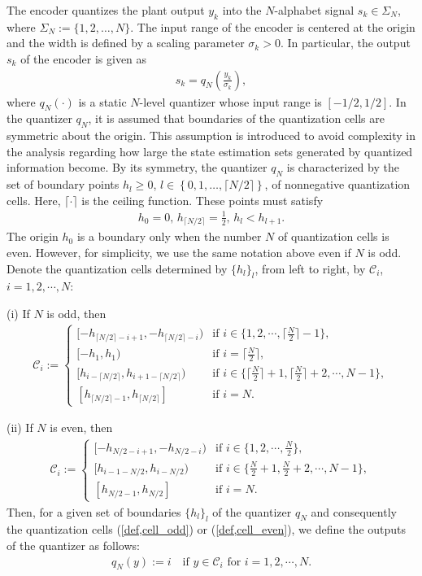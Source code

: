 \documentclass[a4paper, 11pt]{article}
\newcommand{\calC}{\mathcal{C}}
\theoremstyle{definition}
\begin{document}
The encoder quantizes the plant output $y_k$ into the $N$-alphabet signal
$s_k\in\Sigma_N$, where $\Sigma_N:=\{1,2,\dots,N\}$.
The input range of the encoder is centered at the origin and the width
is defined by a scaling parameter $\sigma_k>0$. 
In particular, the output $s_k$ of the encoder is given as
\begin{align}
 s_k=q_N\left(\frac{y_k}{\sigma_k}\right),\label{def,s}
\end{align}
where $q_N(\cdot)$ is a static $N$-level quantizer whose input range is $[-1/2,1/2]$.
In the quantizer $q_N$, it is assumed that boundaries of the quantization
cells are symmetric about the origin.
This assumption is introduced to avoid complexity in the analysis regarding
how large the state estimation sets generated by quantized information become.
By its symmetry, the quantizer $q_N$ is characterized by the set of boundary points
$h_{l}\geq0$, $l\in\left\{0,1,\dots,\lceil N/2\rceil\right\}$,
of nonnegative quantization cells.
Here, $\lceil\cdot\rceil$ is the ceiling function.
These points must satisfy
\begin{align}
 h_0=0,\, h_{\lceil N/2\rceil}=\frac{1}{2},\, h_l<h_{l+1}.\label{quantizeredge}
\end{align}
The origin $h_0$ is a boundary only when the number $N$ of quantization cells is
even.
However, for simplicity, we use the same notation above even if $N$ is odd.
Denote the quantization cells determined by $\{h_l\}_l$, from left to right,
by $\calC_i$, $i=1,2,\cdots,N$:

(i) If $N$ is odd, then
\begin{align}
 \calC_i:=\begin{cases}
	  [-h_{\lceil N/2\rceil-i+1},-h_{\lceil N/2\rceil-i}) & \text{if } i\in\{1,2,\cdots,\lceil\frac{N}{2}\rceil-1\},\\
	  [-h_{1},h_{1}) & \text{if } i=\lceil\frac{N}{2}\rceil,\\
	  [h_{i-\lceil N/2\rceil},h_{i+1-\lceil N/2\rceil}) & \text{if } i\in\{\lceil\frac{N}{2}\rceil+1,\lceil\frac{N}{2}\rceil+2,\cdots,N-1\},\\
	  [h_{\lceil N/2\rceil-1},h_{\lceil N/2\rceil}] & \text{if } i=N.
	 \end{cases}\label{def,cell_odd}
\end{align}

(ii) If $N$ is even, then
\begin{align}
 \calC_i:=\begin{cases}
	  [-h_{N/2-i+1},-h_{N/2-i}) & \text{if } i\in\{1,2,\cdots,\frac{N}{2}\},\\
	  [h_{i-1-N/2},h_{i-N/2})   & \text{if } i\in\{\frac{N}{2}+1,\frac{N}{2}+2,\cdots,N-1\},\\
	  [h_{N/2-1},h_{N/2}] & \text{if } i=N.
	 \end{cases}\label{def,cell_even}
\end{align}
Then, for a given set of boundaries $\{h_l\}_l$ of the quantizer $q_N$
and consequently the quantization cells (\ref{def,cell_odd}) or (\ref{def,cell_even}),
we define the outputs of the quantizer as follows:
\begin{align}
 q_N(y):=i \quad\text{if } y\in \calC_i \text{ for } i=1,2,\cdots,N.\label{def,q}
\end{align}
\end{document}
